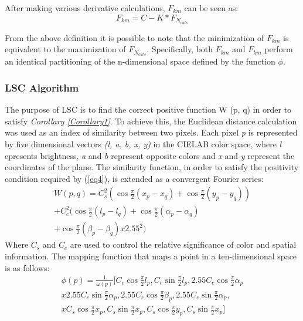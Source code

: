 After making various derivative calculations, $ F_{km} $ can be seen as: 
\begin{equation}
    F_{km} = C - K * F_{N_{cuts}} 
\end{equation}

From the above definition it is possible to note that the minimization of 
$ F_{km} $ is equivalent to the maximization of $ F_{N_{cuts}} $. Specifically, both $ F_{km} $ and 
$ F_{km} $ perform an identical partitioning of the n-dimensional space defined by 
the function $ \phi $.

\subsubsection{LSC Algorithm}
The purpose of LSC is to find the correct positive function W (p, q) in order 
to satisfy {\emph{Corollary \ref{Corollary1}}}. To achieve this, the Euclidean distance calculation 
was used as an index of similarity between two pixels. Each pixel \emph{p} is represented 
by five dimensional vectors \emph{(l, a, b, x, y)} in the CIELAB color space, where \emph{l} 
epresents brightness, \emph{a} and \emph{b} represent opposite colors and \emph{x} and \emph{y} represent
the coordinates of the plane. The similarity function, in order to satisfy 
the positivity condition required by (\ref{eq4}), is extended as a convergent Fourier series: 
\begin{equation}
    \begin{split}
        W(p,q) = C_s^2(\cos \frac{\pi}{2}(x_p-x_q)+\cos\frac{\pi}{2}(y_p-y_q)) \\
        + C_c^2(\cos \frac{\pi}{2}(l_p-l_q)+\cos\frac{\pi}{2}(\alpha_p-\alpha_q) \\
        + \cos\frac{\pi}{2}(\beta_p-\beta_q)x2.55^2)
    \end{split}
\end{equation}
Where $ C_s $ and $ C_c $ are used to control the relative significance of
color and spatial information. The mapping function that maps a point in a ten-dimensional
space is as follows:
\begin{equation}
    \begin{split}
        \phi(p) = \frac{1}{\omega(p)}[C_c\cos\frac{\pi}{2}l_p, C_c\sin\frac{\pi}{2}l_p, 2.55C_c\cos\frac{\pi}{2}\alpha_p \\
        x 2.55C_c\sin\frac{\pi}{2}\alpha_p, 2.55C_c\cos\frac{\pi}{2}\beta_p, 2.55C_c\sin\frac{\pi}{2}\alpha_p, \\
        x C_s\cos\frac{\pi}{2}x_p, C_s\sin\frac{\pi}{2}x_p, C_s\cos\frac{\pi}{2}y_p, C_s\sin\frac{\pi}{2}x_p]
    \end{split}
\end{equation}
